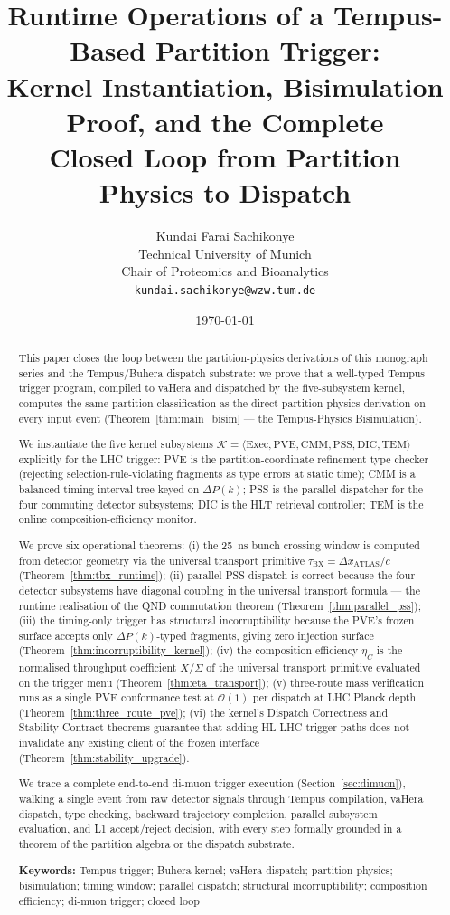 \documentclass[twocolumn,10pt,a4paper]{article}
\title{\textbf{Runtime Operations of a Tempus-Based Partition Trigger:\\
Kernel Instantiation, Bisimulation Proof, and the Complete\\
Closed Loop from Partition Physics to Dispatch}}
\author{
Kundai Farai Sachikonye\\
Technical University of Munich\\
Chair of Proteomics and Bioanalytics\\
\texttt{kundai.sachikonye@wzw.tum.de}
}
\date{\today}
\theoremstyle{thmstyle}
\theoremstyle{definition}
\theoremstyle{remark}
\newcommand{\tBX}{\tau_{\mathrm{BX}}}
\newcommand{\DeltaP}{\Delta P}
\newcommand{\etaC}{\eta_{C}}
\newcommand{\Kernel}{\mathcal{K}}
\newcommand{\TP}{X}
\begin{document}
\maketitle

\begin{abstract}
\noindent
This paper closes the loop between the partition-physics derivations of
this monograph series and the Tempus/Buhera dispatch substrate: we prove
that a well-typed Tempus trigger program, compiled to vaHera and dispatched
by the five-subsystem kernel, computes the same partition classification as
the direct partition-physics derivation on every input event
(Theorem~\ref{thm:main_bisim} — the Tempus-Physics Bisimulation).

We instantiate the five kernel subsystems
$\Kernel = \langle\text{Exec}, \text{PVE}, \text{CMM}, \text{PSS}, \text{DIC}, \text{TEM}\rangle$
explicitly for the LHC trigger:
PVE is the partition-coordinate refinement type checker (rejecting
selection-rule-violating fragments as type errors at static time);
CMM is a balanced timing-interval tree keyed on $\DeltaP(k)$;
PSS is the parallel dispatcher for the four commuting detector subsystems;
DIC is the HLT retrieval controller;
TEM is the online composition-efficiency monitor.

We prove six operational theorems:
(i) the 25~ns bunch crossing window is computed from detector geometry
via the universal transport primitive $\tBX = \Delta x_{\mathrm{ATLAS}}/c$
(Theorem~\ref{thm:tbx_runtime});
(ii) parallel PSS dispatch is correct because the four detector subsystems
have diagonal coupling in the universal transport formula — the runtime
realisation of the QND commutation theorem
(Theorem~\ref{thm:parallel_pss});
(iii) the timing-only trigger has structural incorruptibility because the
PVE's frozen surface accepts only $\DeltaP(k)$-typed fragments, giving zero
injection surface (Theorem~\ref{thm:incorruptibility_kernel});
(iv) the composition efficiency $\etaC$ is the normalised throughput
coefficient $\TP/\Sigma$ of the universal transport primitive evaluated
on the trigger menu (Theorem~\ref{thm:eta_transport});
(v) three-route mass verification runs as a single PVE conformance test
at $\mathcal{O}(1)$ per dispatch at LHC Planck depth
(Theorem~\ref{thm:three_route_pve});
(vi) the kernel's Dispatch Correctness and Stability Contract theorems
guarantee that adding HL-LHC trigger paths does not invalidate any
existing client of the frozen interface
(Theorem~\ref{thm:stability_upgrade}).

We trace a complete end-to-end di-muon trigger execution
(Section~\ref{sec:dimuon}), walking a single event from raw detector
signals through Tempus compilation, vaHera dispatch, type checking,
backward trajectory completion, parallel subsystem evaluation, and L1
accept/reject decision, with every step formally grounded in a theorem of
the partition algebra or the dispatch substrate.

\medskip
\noindent\textbf{Keywords:} Tempus trigger; Buhera kernel; vaHera dispatch;
partition physics; bisimulation; timing window; parallel dispatch;
structural incorruptibility; composition efficiency; di-muon trigger;
closed loop
\end{abstract}
\end{document}
